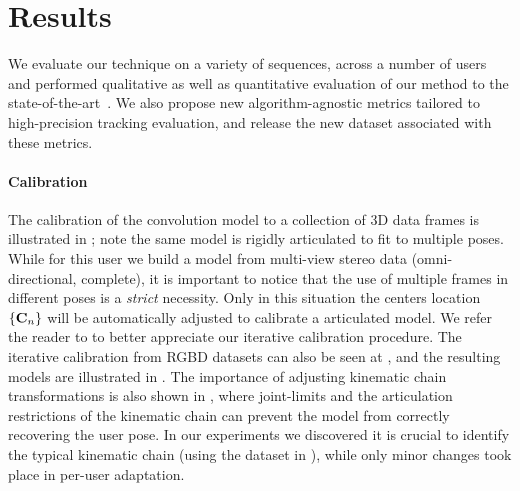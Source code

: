\section{Results}
\label{sec:results}
We evaluate our technique on a variety of sequences, across a number of users and performed qualitative as well as quantitative evaluation of our method to the state-of-the-art~\cite{sridhar2015fast,tagliasacchi2015robust,sharp2015accurate,taylor2016concerto}. We also propose new algorithm-agnostic metrics tailored to high-precision tracking evaluation, and release the new  dataset associated with these metrics.

\paragraph{Calibration}
The calibration of the convolution model to a collection of 3D data frames is illustrated in ; note the same model is rigidly articulated to fit to multiple poses. While for this user we build a model from multi-view stereo data (omni-directional, complete), it is important to notice that the use of multiple frames in different poses is a \emph{strict} necessity. Only in this situation the centers location ${\{\mathbf{C}_n\}}$ will be automatically adjusted to calibrate a  articulated model. We refer the reader to  to better appreciate our iterative calibration procedure. The iterative calibration from RGBD datasets can also be seen at , and the resulting models are illustrated in . The importance of adjusting kinematic chain transformations is also shown in , where joint-limits and the articulation restrictions of the kinematic chain can prevent the model from correctly recovering the user pose. In our experiments we discovered it is crucial to identify the typical kinematic chain (using the dataset in ), while only minor changes took place in per-user adaptation.

